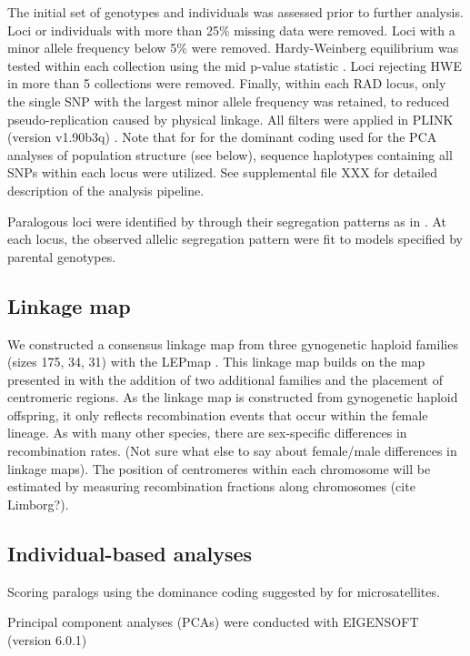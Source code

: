 \documentclass[12pt, one column]{article}
\begin{document}
The initial set of genotypes and individuals was assessed prior to further analysis.  Loci or individuals with more than 25\% missing data were removed.  Loci with a minor allele frequency below 5\% were removed. Hardy-Weinberg equilibrium was tested within each collection using the mid p-value statistic \citep{Graffelman2013}. Loci rejecting HWE in more than 5 collections were removed.  Finally, within each RAD locus, only the single SNP with the largest minor allele frequency was retained, to reduced pseudo-replication caused by physical linkage.  All filters were applied in PLINK (version v1.90b3q) \citep{Chang2014}. Note that for for the dominant coding used for the PCA analyses of population structure (see below), sequence haplotypes containing all SNPs within each locus were utilized. See supplemental file XXX for detailed description of the analysis pipeline.

Paralogous loci were identified by through their segregation patterns as in \citet{Waples2015}.  At each locus, the observed allelic segregation pattern were fit to models specified by parental genotypes.

\subsection*{Linkage map}
We constructed a consensus linkage map from three gynogenetic haploid families (sizes 175, 34, 31) with the  LEPmap \citep{Rastas2013}. This linkage map  builds on the map presented in \citet{Waples2015} with the addition of two additional families and the placement of centromeric regions. As the linkage map is constructed from gynogenetic haploid offspring, it only reflects recombination events that occur within the female lineage. As with many other species, there are sex-specific differences in recombination rates. (Not sure what else to say about female/male differences in linkage maps). The position of centromeres within each chromosome will be estimated by measuring recombination fractions along chromosomes (cite Limborg?).

\subsection*{Individual-based analyses} 
Scoring paralogs using the dominance coding suggested by \citet{Patterson2006} for microsatellites. 

Principal component analyses (PCAs) were conducted with EIGENSOFT (version 6.0.1) \citep{Patterson2006}
\end{document}
